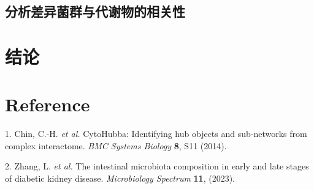 \documentclass[
]{article}
\newenvironment{cslreferences}%
  {}%
  {\par}
\begin{document}
\hypertarget{ux5206ux6790ux5deeux5f02ux83ccux7fa4ux4e0eux4ee3ux8c22ux7269ux7684ux76f8ux5173ux6027}{%
\subsection{分析差异菌群与代谢物的相关性}\label{ux5206ux6790ux5deeux5f02ux83ccux7fa4ux4e0eux4ee3ux8c22ux7269ux7684ux76f8ux5173ux6027}}

\hypertarget{dis}{%
\section{结论}\label{dis}}

\hypertarget{bibliography}{%
\section*{Reference}\label{bibliography}}

\hypertarget{refs}{}
\begin{cslreferences}
\leavevmode\hypertarget{ref-CytohubbaIdenChin2014}{}%
1. Chin, C.-H. \emph{et al.} CytoHubba: Identifying hub objects and sub-networks from complex interactome. \emph{BMC Systems Biology} \textbf{8}, S11 (2014).

\leavevmode\hypertarget{ref-TheIntestinalZhang2023}{}%
2. Zhang, L. \emph{et al.} The intestinal microbiota composition in early and late stages of diabetic kidney disease. \emph{Microbiology Spectrum} \textbf{11}, (2023).
\end{cslreferences}
\end{document}
